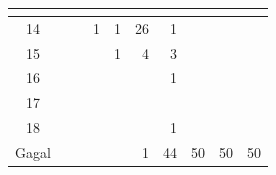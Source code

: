 \begin{minipage}[\minipagealign]{\minipagewidth}
{\begin{tabular}{|c|lllllllll|}
\multicolumn{1}{r|}{} & \multicolumn{1}{r|}{} & \\ \hline 14 & \multicolumn{1}{r|}{} & \multicolumn{1}{r|}{} & \multicolumn{1}{r|}{1} & \multicolumn{1}{r|}{1} & \multicolumn{1}{r|}{26} & \multicolumn{1}{r|}{1} & \multicolumn{1}{r|}{} & \multicolumn{1}{r|}{} & \\ \hline 15 & \multicolumn{1}{r|}{} & \multicolumn{1}{r|}{} & \multicolumn{1}{r|}{} & \multicolumn{1}{r|}{1} & \multicolumn{1}{r|}{4} & \multicolumn{1}{r|}{3} & \multicolumn{1}{r|}{} & \multicolumn{1}{r|}{} & \\ \hline 16 & \multicolumn{1}{r|}{} & \multicolumn{1}{r|}{} & \multicolumn{1}{r|}{} & \multicolumn{1}{r|}{} & \multicolumn{1}{r|}{} & \multicolumn{1}{r|}{1} & \multicolumn{1}{r|}{} & \multicolumn{1}{r|}{} & \\ \hline 17 & \multicolumn{1}{r|}{} & \multicolumn{1}{r|}{} & \multicolumn{1}{r|}{} & \multicolumn{1}{r|}{} & \multicolumn{1}{r|}{} & \multicolumn{1}{r|}{} & \multicolumn{1}{r|}{} & \multicolumn{1}{r|}{} & \\ \hline 18 & \multicolumn{1}{r|}{} & \multicolumn{1}{r|}{} & \multicolumn{1}{r|}{} & \multicolumn{1}{r|}{} & \multicolumn{1}{r|}{} & \multicolumn{1}{r|}{1} & \multicolumn{1}{r|}{} & \multicolumn{1}{r|}{} & \\ \hline Gagal & \multicolumn{1}{r|}{} & \multicolumn{1}{r|}{} & \multicolumn{1}{r|}{} & \multicolumn{1}{r|}{} & \multicolumn{1}{r|}{1} & \multicolumn{1}{r|}{44} & \multicolumn{1}{r|}{50} & \multicolumn{1}{r|}{50} & 50 \\ \hline
		\end{tabular}
	}
\end{minipage}

